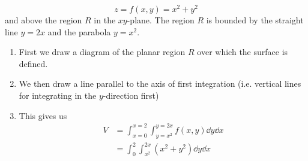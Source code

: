 \begin{itemize}
\begin{example}
\begin{equation}
                  z=f(x,y) = x^2+y^2
              \end{equation}
              and above the region $R$ in the $xy$-plane. The region $R$ is bounded by the straight line $y=2x$ and the parabola $y=x^2$.
              \begin{enumerate}
                  \item First we draw a diagram of the planar region $R$ over which the surface is defined.
                        \begin{center}
                        \end{center}
                  \item We then draw a line parallel to the axis of first integration (i.e. vertical lines for integrating in the $y$-direction first)
                  \item This gives us
                        \begin{align}
                            V & = \int_{x=0}^{x=2} \int_{y=x^2}^{y=2x}f(x,y)\dd{y}\dd{x} \\
                              & = \int_0^2 \int_{x^2}^{2x} (x^2+y^2)\dd{y}\dd{x}         \\

\end{align}
\end{enumerate}
\end{example}
\end{itemize}
